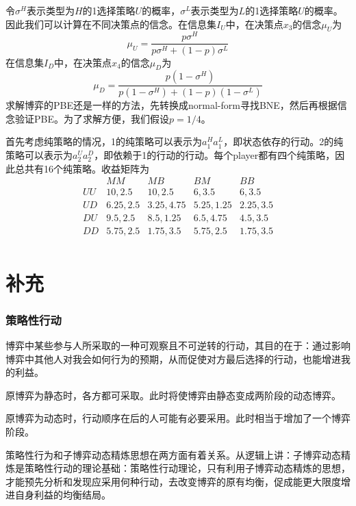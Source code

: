 \documentclass[UTF8,12pt]{ctexart}
\numberwithin{equation}{section} %
\numberwithin{figure}{section}
\numberwithin{table}{section}
\begin{document}
	令$\sigma^H$表示类型为$H$的1选择策略$U$的概率，$\sigma^L$表示类型为$L$的1选择策略$U$的概率。因此我们可以计算在不同决策点的信念。在信息集$I_U$中，在决策点$x_3$的信念$\mu_U$为
	\begin{equation}
		\mu_U = \dfrac{p\sigma^H}{p\sigma^H + (1-p)\sigma^L}
	\end{equation}
	在信息集$I_D$中，在决策点$x_4$的信念$\mu_D$为
	\begin{equation}
		\mu_D = \dfrac{p(1-\sigma^H)}{p(1-\sigma^H) + (1-p)(1-\sigma^L)}
	\end{equation}
	求解博弈的PBE还是一样的方法，先转换成normal-form寻找BNE，然后再根据信念验证PBE。为了求解方便，我们假设$p = 1/4$。
	
	首先考虑纯策略的情况，1的纯策略可以表示为$a_1^Ha_1^L$，即状态依存的行动。2的纯策略可以表示为$a_2^Ua_2^D$，即依赖于1的行动的行动。每个player都有四个纯策略，因此总共有16个纯策略。收益矩阵为
	\begin{equation}
		\begin{array}{|c|c|c|c|c|}
			& MM & MB & BM & BB \\
			UU & 10,2.5 & 10,2.5 & 6,3.5 & 6,3.5 \\
			UD & 6.25,2.5 & 3.25,4.75 & 5.25,1.25 & 2.25,3.5  \\
			DU & 9.5,2.5 & 8.5,1.25 & 6.5,4.75 & 4.5,3.5\\
			DD & 5.75,2.5 & 1.75,3.5 & 5.75,2.5 & 1.75,3.5 \\
		\end{array}
	\end{equation}
	
	\newpage
	
	\part{补充}
	
	\section{策略性行动}
	博弈中某些参与人所采取的一种可观察且不可逆转的行动，其目的在于：通过影响博弈中其他人对我会如何行为的预期，从而促使对方最后选择的行动，也能增进我的利益。
	
	原博弈为静态时，各方都可采取。此时将使博弈由静态变成两阶段的动态博弈。
	
	原博弈为动态时，行动顺序在后的人可能有必要采用。此时相当于增加了一个博弈阶段。
	
	策略性行为和子博弈动态精炼思想在两方面有着关系。从逻辑上讲：子博弈动态精炼是策略性行动的理论基础：策略性行动理论，只有利用子博弈动态精炼的思想，才能预先分析和发现应采用何种行动，去改变博弈的原有均衡，促成能更大限度增进自身利益的均衡结局。
	
\end{document}
